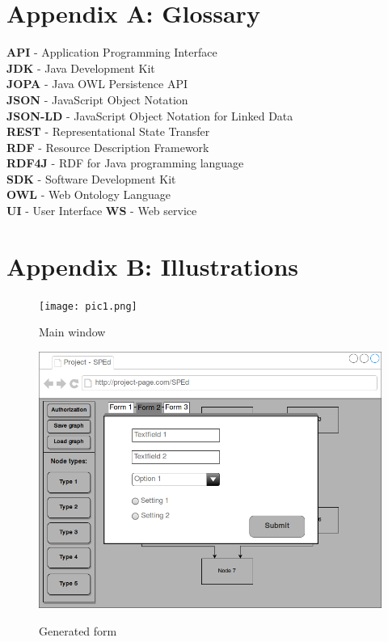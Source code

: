 \documentclass{article}
\begin{document}
\section*{Appendix A: Glossary}
\textbf{API} - Application Programming Interface\\
\textbf{JDK} - Java Development Kit\\
\textbf{JOPA} - Java OWL Persistence API\\
\textbf{JSON} - JavaScript Object Notation\\
\textbf{JSON-LD} - JavaScript Object Notation for Linked Data\\
\textbf{REST} - Representational State Transfer\\
\textbf{RDF} - Resource Description Framework\\
\textbf{RDF4J} - RDF for Java programming language\\
\textbf{SDK} - Software Development Kit\\
\textbf{OWL} - Web Ontology Language\\
\textbf{UI} - User Interface
\textbf{WS} - Web service
\newpage
\section*{Appendix B: Illustrations}
\begin{figure}[h!]
    \texttt{[image: pic1.png]}
    \label{pic1}
    \caption{Main window}
\end{figure}
\begin{figure}[h!]
    \includegraphics[width=\textwidth]{pic2.png}
    \label{pic2}
    \caption{Generated form}
\end{figure}
\end{document}
